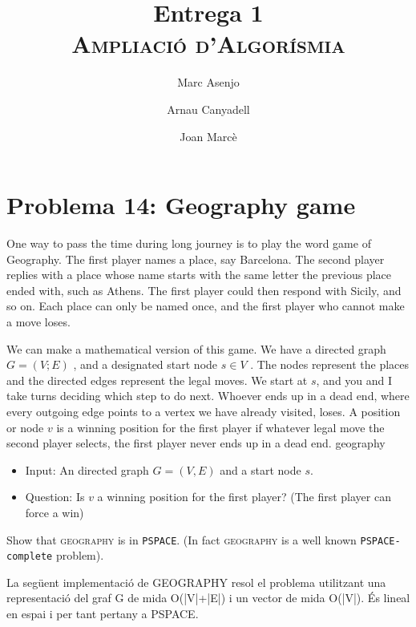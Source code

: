 \documentclass[a4paper]{article}
\title{Entrega 1 \\ \textsc{Ampliació d'Algorísmia}}
\author{Marc Asenjo \and Arnau Canyadell \and Joan Marcè}
\date{}
\begin{document}
\maketitle

\section{Problema 14: Geography game}


One way to pass the time during long journey is to play the word game
of Geography. The first player names a place, say Barcelona. The second player replies
with a place whose name starts with the same letter the previous place ended with, such as
Athens. The first player could then respond with Sicily, and so on. Each place can only be
named once, and the first player who cannot make a move loses.

We can make a mathematical version of this game. We have a directed graph $G = (V;E)$ ,
and a designated start node $s \in V$ . The nodes represent the places and the directed edges
represent the legal moves. We start at $s$, and you and I take turns deciding which step to
do next. Whoever ends up in a dead end, where every outgoing edge points to a vertex we
have already visited, loses. A position or node $v$ is a winning position for the first player if
whatever legal move the second player selects, the first player never ends up in a dead end.
geography

\begin{itemize}
	\item Input: An directed graph $G = (V, E)$ and a start node $s$.
	\item Question: Is $v$ a winning position for the first player? (The first player can force a win)
\end{itemize}

Show that \textsc{geography} is in \texttt{PSPACE}. (In fact \textsc{geography} is a well known \texttt{PSPACE-complete}
problem).

La següent implementació de GEOGRAPHY resol el problema utilitzant una representació del graf G de mida O(|V|+|E|) i un vector de mida O(|V|). És lineal en espai i per tant pertany a PSPACE.
\end{document}
